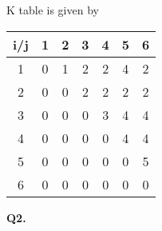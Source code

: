 \documentclass[11pt]{article}
\begin{document}
K table is given by \\
\begin{center}
 \begin{tabular}{||c c c c c c c||} 
 \hline
 i/j & 1 & 2 & 3 & 4 & 5 & 6 \\ [0.5ex] 
 \hline\hline
 1 & 0 & 1 & 2 & 2 & 4 & 2 \\ 
 \hline 
 2 & 0 & 0   & 2 & 2 & 2 & 2 \\
 \hline
 3 & 0 & 0   & 0   & 3 & 4  & 4 \\
 \hline
 4 & 0 & 0   & 0   & 0   & 4 & 4 \\
 \hline
 5 & 0 & 0   & 0   & 0   & 0    & 5\\
 \hline 
 6 & 0 & 0   & 0   & 0   & 0    & 0\\[1ex] 
 \hline
\end{tabular}
\end{center}

\hline
\vspace{5mm}
\textbf{Q2.}\\
\end{document}
